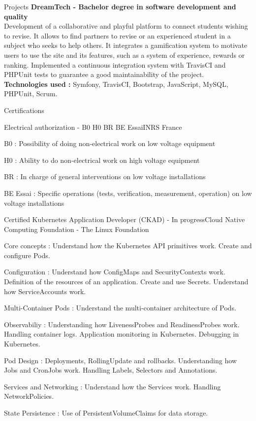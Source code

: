 \documentclass[
	11pt, %
]{resume}
\begin{document}
\begin{rSection}{Projects}
	{\bf DreamTech - Bachelor degree in software development and quality}
	\\ Development of a collaborative and playful platform to connect students wishing to revise. 
	It allows to find partners to revise or an experienced student in a subject who seeks to help others. 
	It integrates a gamification system to motivate users to use the site and its features, such as a system of experience, rewards or ranking. 
	Implemented a continuous integration system with TravisCI and PHPUnit tests to guarantee a good maintainability of the project.
	\\ \textbf{Technologies used :} Symfony, TravisCI, Bootstrap, JavaScript, MySQL, PHPUnit, Scrum.


\end{rSection}

\begin{rSection}{Certifications}

    \begin{rSubsection}{Electrical authorization - B0 H0 BR BE Essai}{INRS France}{}{}
	\item B0 : Possibility of doing non-electrical work on low voltage equipment
	\item H0 : Ability to do non-electrical work on high voltage equipment
	\item BR : In charge of general interventions on low voltage installations
	\item BE Essai : Specific operations (tests, verification, measurement, operation) on low voltage installations
    \end{rSubsection}

    \begin{rSubsection}{Certified Kubernetes Application Developer (CKAD) - In progress}{Cloud Native Computing Foundation - The Linux Foundation}{}{}
	\item Core concepts : Understand how the Kubernetes API primitives work. Create and configure Pods.
	\item Configuration : Understand how ConfigMaps and SecurityContexts work. Definition of the resources of an application. Create and use Secrets. Understand how ServiceAccounts work.
	\item Multi-Container Pods : Understand the multi-container architecture of Pods.
	\item Observabiliy : Understanding how LivenessProbes and ReadinessProbes work. Handling container logs. Application monitoring in Kubernetes. Debugging in Kubernetes.
	\item Pod Design : Deployments, RollingUpdate and rollbacks. Understanding how Jobs and CronJobs work. Handling Labels, Selectors and Annotations.
	\item Services and Networking : Understand how the Services work. Handling NetworkPolicies.
	\item State Persistence : Use of PersistentVolumeClaims for data storage.
    \end{rSubsection}

\end{rSection}
\end{document}
